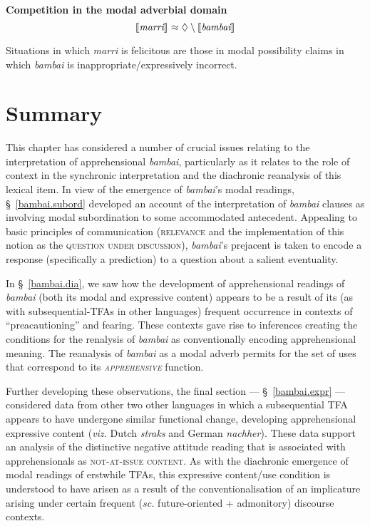 \pex \textbf{Competition in the modal adverbial domain} $$\llbracket{\textit{marri}}\rrbracket^{}\approx\lozenge\setminus\llbracket{\textit{bambai}}\rrbracket^{}$$

Situations in which \textit{marri} is felicitous are those in modal possibility claims in which \textit{bambai} is inappropriate/expressively incorrect.

\xe

\section{Summary}


This chapter has considered a number of crucial issues relating to the interpretation of apprehensional \textit{bambai}, particularly as it relates to the role of context in the synchronic interpretation and the diachronic reanalysis of this lexical item. In view of the emergence of \textit{bambai}'s modal readings, \S~\ref{bambai.subord} developed an account of the interpretation of \textit{bambai} clauses as involving modal subordination to some accommodated antecedent. Appealing to basic principles of communication (\textsc{relevance} and the implementation of this notion as the \textsc{question under discussion}), \textit{bambai}'s prejacent is taken to encode a response (specifically a prediction) to a question about a salient eventuality.


In §~\ref{bambai.dia}, we saw how the development of apprehensional readings of \textit{bambai} (both its modal and expressive content) appears to be a result of its (as with subseq\-uential-TFAs in other languages) frequent occurrence in contexts of ``preacautioning'' and fearing. These contexts gave rise to inferences creating the conditions for the renalysis of \textit{bambai} as conventionally encoding apprehensional meaning. The reanalysis of \textit{bambai} as a modal adverb permits for the set of uses that correspond to its \textit{\textsc{apprehensive}} function.

Further developing these observations, the final section --- \S~\ref{bambai.expr} --- considered data from other two other languages in which a subsequential TFA appears to have undergone similar functional change, developing apprehensional expressive content (\textit{viz.} Dutch \textit{straks} and German \textit{nachher}). These data support an analysis of the distinctive negative attitude reading that is associated with apprehensionals as \textsc{not-at-issue content}. As with the diachronic emergence of modal readings of erstwhile TFAs, this expressive content/use condition is understood to have arisen as a result of the conventionalisation of an implicature arising under certain frequent (\textit{sc. }future-oriented + admonitory) discourse contexts.

